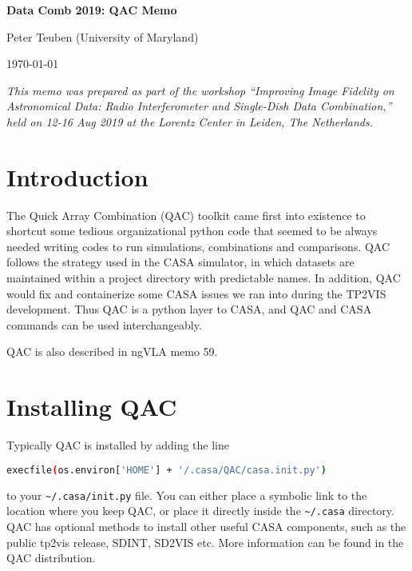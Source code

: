 \documentclass[12pt,a4paper]{article}
\begin{document}
\pagestyle{plain}
 

\begin{center}
{\Large{\bf{  Data Comb 2019: QAC Memo \\  }}} 

\end{center}
\bigskip

\centerline{Peter Teuben (University of Maryland)}

\centerline{\today}
\bigskip

\noindent \textit{This memo was prepared as part of the workshop ``Improving Image Fidelity on Astronomical Data: Radio Interferometer and Single-Dish Data Combination,'' held on 12-16 Aug 2019 at the Lorentz Center in Leiden, The Netherlands.}

\section{Introduction}

The Quick Array Combination (QAC) toolkit came first into existence to shortcut some tedious organizational python code that seemed to be always needed
writing codes to run simulations, combinations and comparisons. QAC follows the strategy used in the CASA simulator, in which
datasets are maintained within a project directory with predictable names.
In addition, QAC would fix and containerize some CASA issues we ran into during the TP2VIS development. Thus QAC is a python layer to CASA,
and QAC and CASA commands can be used interchangeably.

QAC is also described in ngVLA memo 59.

\section{Installing QAC}

Typically QAC is installed by adding the line
\begin{lstlisting}[language=bash]
    execfile(os.environ['HOME'] + '/.casa/QAC/casa.init.py')
\end{lstlisting}

to your \verb+~/.casa/init.py+ file. You can either place a symbolic link to the location where you keep QAC, or place it directly
inside the \verb+~/.casa+ directory.  QAC has optional methods to install other useful CASA components, such
as the public tp2vis release, SDINT, SD2VIS etc. More information can be found in the QAC distribution.
\end{document}
